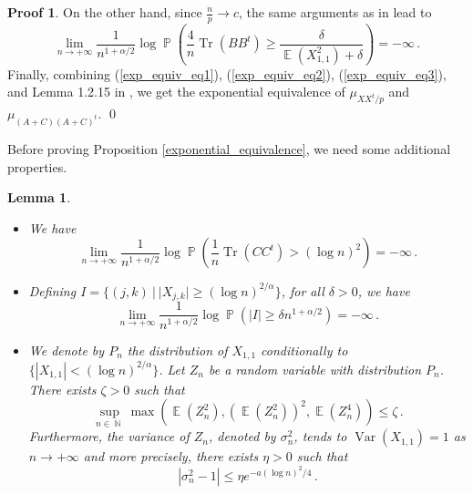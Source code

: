 \documentclass[11pt,a4paper]{article}
\DeclareMathOperator{\E}{\mathbb{E}}
\DeclareMathOperator{\N}{\mathbb{N}}
\DeclareMathOperator{\PR}{\mathbb{P}}
\DeclareMathOperator{\1}{\mathbf{1}}
\DeclareMathOperator{\Var}{\mathrm{Var}}
\DeclareMathOperator{\Tr}{\mathrm{Tr}}
\newtheorem{Lemma}[Proposition]{Lemma}
\theoremstyle{definition}
\newtheorem*{Proof}{Proof}
\begin{document}
\begin{Proof}
On the other hand, since $\frac{n}{p} \to c$, the same arguments as in \cite{BC} lead to
\begin{equation} \label{exp_equiv_eq3}
\lim_{n \to +\infty} \frac{1}{n^{1+\alpha/2}} \log \PR \left( \frac4n \Tr(BB^t) \ge \frac{\delta}{\E(X_{1,1}^2) + \delta} \right) = -\infty \, .
\end{equation}
Finally, combining (\ref{exp_equiv_eq1}), (\ref{exp_equiv_eq2}), (\ref{exp_equiv_eq3}), and Lemma 1.2.15 in \cite{DZ}, we get the exponential equivalence of $\mu_{XX^t/p}$ and $\mu_{(A+C)(A+C)^t}$. \qed
\end{Proof}

Before proving Proposition \ref{exponential_equivalence}, we need some additional properties.

\begin{Lemma} \label{exp_equiv_lemma3}
\begin{itemize}
\item[(i)] We have
\begin{displaymath}
\lim_{n \to +\infty} \frac{1}{n^{1+\alpha/2}} \log \PR \left( \frac1n \Tr(CC^t) > (\log n)^2 \right) = -\infty \, .
\end{displaymath}
\item[(ii)] Defining $I=\{ (j,k) \ | \ |X_{j,k}| \ge (\log n)^{2/\alpha} \}$, for all $\delta>0$, we have
\begin{displaymath}
\lim_{n \to +\infty} \frac{1}{n^{1+\alpha/2}} \log \PR \left( |I| \ge \delta n^{1+\alpha/2} \right) = -\infty \, .
\end{displaymath}
\item[(iii)] We denote by $P_n$ the distribution of $X_{1,1}$ conditionally to $\{ |X_{1,1}| < (\log n)^{2/\alpha} \}$. Let $Z_n$ be a random variable with distribution $P_n$. There exists $\zeta>0$ such that
\begin{displaymath}
\sup_{n \in \N} \max \left( \E(Z_n^2) , (\E(Z_n^2))^2 , \E(Z_n^4) \right) \le \zeta \, .
\end{displaymath}
Furthermore, the variance of $Z_n$, denoted by $\sigma_n^2$, tends to $\Var(X_{1,1})=1$ as $n \to +\infty$ and more precisely, there exists $\eta>0$ such that
\begin{displaymath}
|\sigma_n^2-1| \le \eta e^{-a(\log n)^2/4} \, .
\end{displaymath}
\end{itemize}
\end{Lemma}
\end{document}
